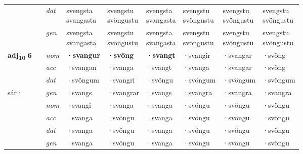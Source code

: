 \begin{longtable}{l>{\footnotesize\itshape}l>{\footnotesize\itshape}lXXXXXX}
 & & dat & \specialcell{svengsta\\ svangasta} & \specialcell{svengstu\\ svöngustu} & \specialcell{svengsta\\ svangasta} & \specialcell{svengstu\\ svöngustu} & \specialcell{svengstu\\ svöngustu} & \specialcell{svengstu\\ svöngustu} \\*
 & & gen & \specialcell{svengsta\\ svangasta} & \specialcell{svengstu\\ svöngustu} & \specialcell{svengsta\\ svangasta} & \specialcell{svengstu\\ svöngustu} & \specialcell{svengstu\\ svöngustu} & \specialcell{svengstu\\ svöngustu} \\
\cmidrule{1-9}



\multirow{3}{*}{{{\textbf{adj{\textsubscript{10}}} \Large{\textbf{6}}}}} & \multirow{4}{*}{\begin{turn}{90}\textit{pos s}\end{turn}} & nom & \textbf{·svangur} & \textbf{·svöng} & \textbf{·svangt} & ·svangir & ·svangar & ·svöng \\*
 & & acc & ·svangan & ·svanga & ·svangt & ·svanga & ·svangar & ·svöng \\*
 & & dat & ·svöngum & ·svangri & ·svöngu & ·svöngum & ·svöngum & ·svöngum \\*
 \multirow{5}{*}{sár\allowbreak ·} & & gen & ·svangs & ·svangrar & ·svangs & ·svangra & ·svangra & ·svangra \\
\cmidrule{2-9}
& \multirow{4}{*}{\begin{turn}{90}\textit{pos w}\end{turn}} & nom & ·svangi & ·svanga & ·svanga & ·svöngu & ·svöngu & ·svöngu \\*
 & &  acc & ·svanga & ·svöngu & ·svanga & ·svöngu & ·svöngu & ·svöngu \\*
 & & dat & ·svanga & ·svöngu & ·svanga & ·svöngu & ·svöngu & ·svöngu \\*
 & & gen & ·svanga & ·svöngu & ·svanga & ·svöngu & ·svöngu & ·svöngu \\
\cmidrule{1-9}




\end{longtable}
